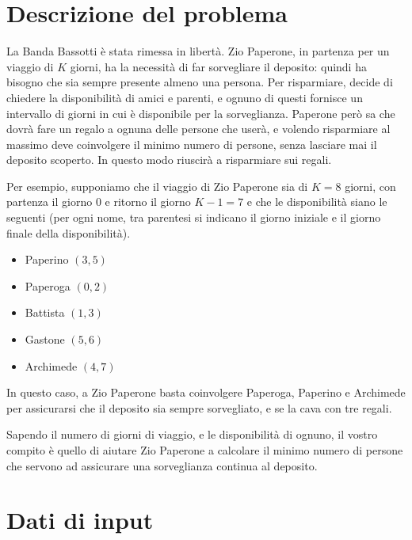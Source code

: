 \documentclass[a4paper,11pt]{article}
\begin{document}
\vspace{0.5cm}



\vspace{0.5cm}

\section*{Descrizione del problema}
  
La Banda Bassotti è stata rimessa in libertà. Zio Paperone, in partenza
per un viaggio di $K$ giorni, ha la necessità di far sorvegliare il
deposito: quindi ha bisogno che sia sempre presente almeno una persona.
Per risparmiare, decide di chiedere la disponibilità di amici e parenti,
e ognuno di questi fornisce un intervallo di giorni in cui è disponibile
per la sorveglianza. Paperone però sa che dovrà fare un regalo a ognuna
delle persone che userà, e volendo risparmiare al massimo deve
coinvolgere il minimo numero di persone, senza lasciare mai il deposito
scoperto. In questo modo riuscirà a risparmiare sui regali.
    
Per esempio, supponiamo che il viaggio di Zio Paperone sia di $K=8$
giorni, con partenza il giorno $0$ e ritorno il giorno $K-1=7$  e che le
disponibilità siano le seguenti (per ogni nome, tra parentesi si
indicano il giorno iniziale e il giorno finale della disponibilità).

\begin{itemize}
  \item Paperino $(3,5)$
  \item Paperoga $(0,2)$
  \item Battista $(1,3)$
  \item Gastone $(5,6)$
  \item Archimede $(4,7)$
\end{itemize}

In questo caso, a Zio Paperone basta coinvolgere Paperoga, Paperino e
Archimede per assicurarsi che il deposito sia sempre sorvegliato, e se
la cava con tre regali.

Sapendo il numero di giorni di viaggio, e le disponibilità di ognuno, il
vostro compito è quello di aiutare Zio Paperone a calcolare il minimo
numero di persone che servono ad assicurare una sorveglianza continua al
deposito. 


\section*{Dati di input}
  
\end{document}
